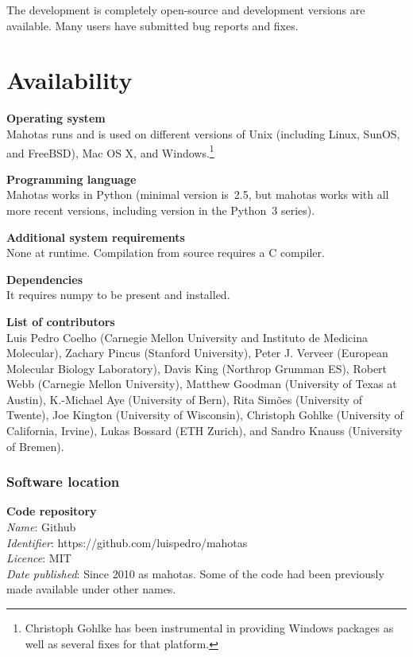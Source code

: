 \documentclass{scrartcl}
\newcommand*{\cpp}{{C\nolinebreak[4]\hspace{-.05em}\raisebox{.4ex}{\tiny\textbf{++}}}}
\begin{document}
The development is completely open-source and development versions are
available. Many users have submitted bug reports and fixes.

\section{Availability}

\textbf{Operating system}\\
Mahotas runs and is used on different versions of Unix (including Linux, SunOS,
and FreeBSD), Mac OS X, and Windows.\footnote{Christoph Gohlke has been
instrumental in providing Windows packages as well as several fixes for that
platform.}


\textbf{Programming language}\\
Mahotas works in Python (minimal version is~2.5, but mahotas works with all
more recent versions, including version in the Python~3 series).

\textbf{Additional system requirements}\\
None at runtime. Compilation from source requires a \cpp{} compiler.

\textbf{Dependencies}\\
It requires numpy to be present and installed.


\textbf{List of contributors}\\
Luis Pedro Coelho (Carnegie Mellon University and Instituto de Medicina
Molecular), Zachary Pincus (Stanford University), Peter J. Verveer (European
Molecular Biology Laboratory), Davis King (Northrop Grumman ES), Robert Webb
(Carnegie Mellon University), Matthew Goodman (University of Texas at Austin),
K.-Michael Aye (University of Bern), Rita Sim\~{o}es (University of Twente),
Joe Kington (University of Wisconsin), Christoph Gohlke (University of
California, Irvine), Lukas Bossard (ETH Zurich), and Sandro Knauss (University
of Bremen).

\subsubsection{Software location}

\textbf{Code repository}\\
\textit{Name}: Github\\
\textit{Identifier}: https://github.com/luispedro/mahotas\\
\textit{Licence}: MIT\\
\textit{Date published}: Since 2010 as mahotas. Some of the code had been
previously made available under other names.
\end{document}
